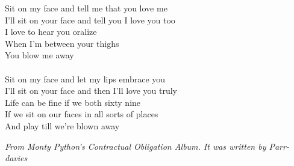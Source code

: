 \vspace{10pt}
Sit on my face and tell me that you love me\\
I'll sit on your face and tell you I love you too\\
I love to hear you oralize\\
When I'm between your thighs\\
You blow me away\\
\\
Sit on my face and let my lips embrace you\\
I'll sit on your face and then I'll love you truly\\
Life can be fine if we both sixty nine\\
If we sit on our faces in all sorts of places\\
And play till we're blown away
\par
\vspace{10pt}
{\footnotesize\textit{From Monty Python's Contractual Obligation Album. It was written by Parr-davies}}
